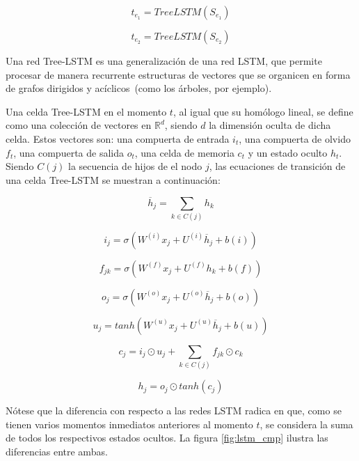 \begin{equation*}
	t_{e_1} = TreeLSTM(S_{e_1})
\end{equation*}


\begin{equation*}
	t_{e_2} = TreeLSTM(S_{e_2})
\end{equation*}


Una red Tree-LSTM es una generalización de una red LSTM, que permite procesar de manera recurrente estructuras de vectores que se organicen en forma de grafos dirigidos y acíclicos~(como los árboles, por ejemplo).

Una celda Tree-LSTM en el momento $t$, al igual que su homólogo lineal, se define como una colección de vectores en $\mathbb{R}^d$, siendo $d$ la dimensión oculta de dicha celda.
Estos vectores son: una compuerta de entrada $i_t$, una compuerta de olvido $f_t$, una compuerta de salida $o_t$, una celda de memoria $c_t$ y un estado oculto $h_t$. Siendo $C(j)$ la secuencia de hijos de el nodo $j$, las ecuaciones de transición de una celda Tree-LSTM se muestran a continuación:

\begin{equation*}
	\overline{h}_j = \sum_{k\in C(j)} h_k
\end{equation*}

\begin{equation*}
i_j = \sigma(W^{(i)}x_j + U^{(i)}\overline{h}_j + b(i))
\end{equation*}

\begin{equation*}
f_{jk} = \sigma(W^{(f)}x_j + U^{(f)}h_k + b(f))
\end{equation*}

\begin{equation*}
o_j = \sigma(W^{(o)}x_j + U^{(o)}\overline{h}_j + b(o))
\end{equation*}

\begin{equation*}
u_j = tanh(W^{(u)}x_j + U^{(u)}\overline{h}_j + b(u))
\end{equation*}

\begin{equation*}
c_j = i_j \odot u_j + \sum_{k\in C(j)} f_{jk} \odot c_k
\end{equation*}

\begin{equation*}
h_j = o_j \odot tanh(c_j)
\end{equation*}

Nótese que la diferencia con respecto a las redes LSTM radica en que, como se tienen varios momentos inmediatos anteriores al momento $t$, se considera la suma de todos los respectivos estados ocultos. La figura \ref{fig:lstm_cmp} ilustra las diferencias entre ambas.

